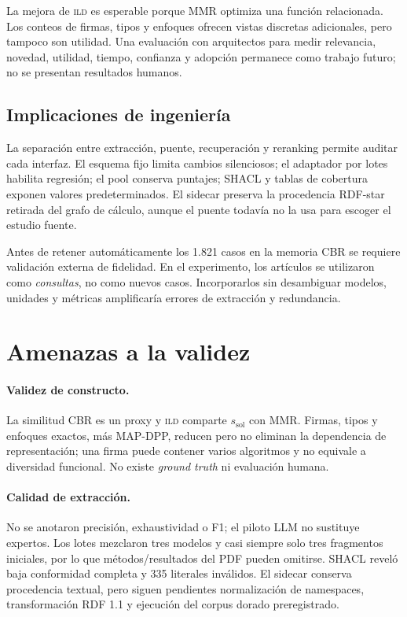 \documentclass[11pt,a4paper]{article}
\newcommand{\ILD}{\textsc{ild}}
\begin{document}
La mejora de \ILD{} es esperable porque MMR optimiza una función relacionada. Los conteos de firmas, tipos y enfoques ofrecen vistas discretas adicionales, pero tampoco son utilidad. Una evaluación con arquitectos para medir relevancia, novedad, utilidad, tiempo, confianza y adopción permanece como trabajo futuro; no se presentan resultados humanos.

\subsection{Implicaciones de ingeniería}

La separación entre extracción, puente, recuperación y reranking permite auditar cada interfaz. El esquema fijo limita cambios silenciosos; el adaptador por lotes habilita regresión; el pool conserva puntajes; SHACL y tablas de cobertura exponen valores predeterminados. El sidecar preserva la procedencia RDF-star retirada del grafo de cálculo, aunque el puente todavía no la usa para escoger el estudio fuente.

Antes de retener automáticamente los 1.821 casos en la memoria CBR se requiere validación externa de fidelidad. En el experimento, los artículos se utilizaron como \emph{consultas}, no como nuevos casos. Incorporarlos sin desambiguar modelos, unidades y métricas amplificaría errores de extracción y redundancia.

\section{Amenazas a la validez}
\label{sec:threats}

\paragraph{Validez de constructo.}
La similitud CBR es un proxy y \ILD{} comparte $s_{\mathrm{sol}}$ con MMR. Firmas, tipos y enfoques exactos, más MAP-DPP, reducen pero no eliminan la dependencia de representación; una firma puede contener varios algoritmos y no equivale a diversidad funcional. No existe \emph{ground truth} ni evaluación humana.

\paragraph{Calidad de extracción.}
No se anotaron precisión, exhaustividad o F1; el piloto LLM no sustituye expertos. Los lotes mezclaron tres modelos y casi siempre solo tres fragmentos iniciales, por lo que métodos/resultados del PDF pueden omitirse. SHACL reveló baja conformidad completa y 335 literales inválidos. El sidecar conserva procedencia textual, pero siguen pendientes normalización de namespaces, transformación RDF 1.1 y ejecución del corpus dorado preregistrado.
\end{document}
